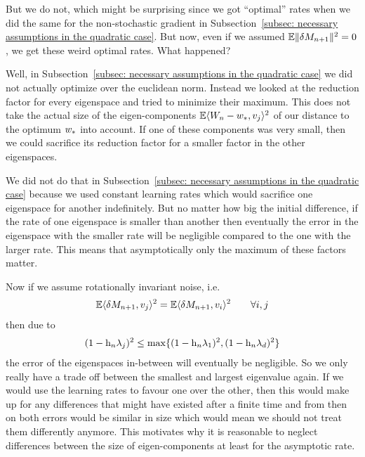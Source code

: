 But we do not, which might be surprising since we got ``optimal'' rates when
we did the same for the non-stochastic gradient in Subsection~\ref{subsec:
necessary assumptions in the quadratic case}. But now, even if we assumed
\(\mathbb{E}\|\delta M_{n+1}\|^2=0\), we get these weird optimal rates. What happened?

Well, in Subsection~\ref{subsec: necessary assumptions in the quadratic case}
we did not actually optimize over the euclidean norm. Instead we looked at the
reduction factor for every eigenspace and tried to minimize their maximum.
This does not take the actual size of the eigen-components
\(\mathbb{E}\langle W_n-w_*, v_j\rangle^2\) of our distance to the optimum
\(w_*\) into account. If one of these components was very small, then
we could sacrifice its reduction factor for a smaller factor in the other
eigenspaces.

We did not do that in Subsection~\ref{subsec: necessary assumptions
in the quadratic case} because we used constant learning rates which would
sacrifice one eigenspace for another indefinitely. But no matter how big the
initial difference, if the rate of one eigenspace is smaller than another then
eventually the error in the eigenspace with the smaller rate will be
negligible compared to the one with the larger rate. This means that
asymptotically only the maximum of these factors matter.

Now if we assume rotationally invariant noise, i.e.
\begin{align*}
	\mathbb{E}\langle\delta M_{n+1},v_j\rangle^2 = \mathbb{E}\langle\delta M_{n+1}, v_i\rangle^2
	\qquad \forall i,j
\end{align*}
then due to
\begin{align*}
	(1-\text{h}_n \lambda_j)^2
	\le \max \{ (1-\text{h}_n\lambda_1)^2, (1-\text{h}_n\lambda_d)^2 \}
\end{align*}
the error of the eigenspaces in-between will eventually be negligible. So we 
only really have a trade off between the smallest and largest eigenvalue again.
If we would use the learning rates to favour one over the other, then this would
make up for any differences that might have existed after a finite time and
from then on both errors would be similar in size which would mean we should
not treat them differently anymore. This motivates why it is reasonable to
neglect differences between the size of eigen-components at least for the
asymptotic rate.


